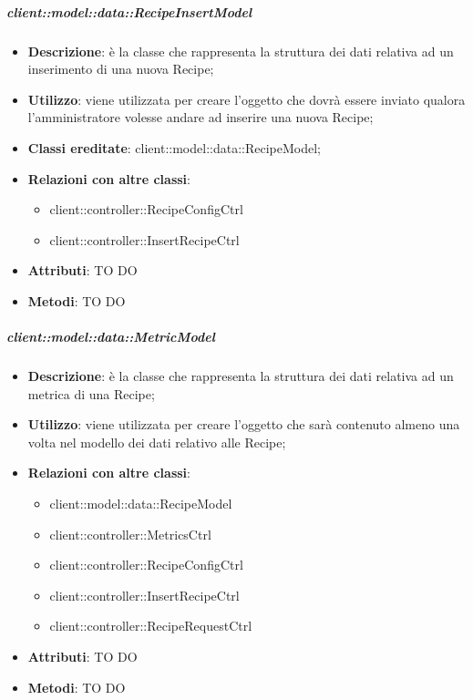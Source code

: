 		\subparagraph{client::model::data::RecipeInsertModel} %
		\label{subp:client_model_data_recipeinsertmodel}
			\begin{itemize}
				\item \textbf{Descrizione}: è la classe che rappresenta la struttura dei dati relativa ad un inserimento di una nuova Recipe;
				\item \textbf{Utilizzo}: viene utilizzata per creare l'oggetto che dovrà essere inviato qualora l'amministratore volesse andare ad inserire una nuova Recipe;
				\item \textbf{Classi ereditate}: client::model::data::RecipeModel;
				\item \textbf{Relazioni con altre classi}:
					\begin{itemize}
						\item client::controller::RecipeConfigCtrl
						\item client::controller::InsertRecipeCtrl
					\end{itemize}
				\item \textbf{Attributi}: TO DO
				\item \textbf{Metodi}: TO DO
			\end{itemize}

		\subparagraph{client::model::data::MetricModel} %
		\label{subp:client_model_data_metricmodel}
			\begin{itemize}
				\item \textbf{Descrizione}: è la classe che rappresenta la struttura dei dati relativa ad un metrica di una Recipe;
				\item \textbf{Utilizzo}: viene utilizzata per creare l'oggetto che sarà contenuto almeno una volta nel modello dei dati relativo alle Recipe;
				\item \textbf{Relazioni con altre classi}:
					\begin{itemize}
						\item client::model::data::RecipeModel
						\item client::controller::MetricsCtrl
						\item client::controller::RecipeConfigCtrl
						\item client::controller::InsertRecipeCtrl
						\item client::controller::RecipeRequestCtrl
					\end{itemize}
				\item \textbf{Attributi}: TO DO
				\item \textbf{Metodi}: TO DO
			\end{itemize}

